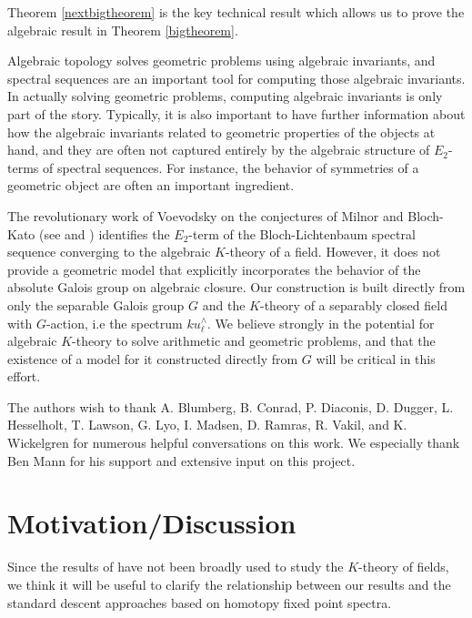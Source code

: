 \documentclass[11pt]{article}
\begin{document}
Theorem \ref{nextbigtheorem} is the key technical result which allows us to prove the algebraic result in Theorem \ref{bigtheorem}.  



{Algebraic topology solves geometric problems  using algebraic invariants, and spectral sequences are an important tool for computing those algebraic invariants.  In actually solving geometric problems, computing algebraic invariants is only part of the story.  Typically, it is also important to have further information about how the algebraic invariants related to geometric properties of the  objects at hand, and they are often not captured entirely by the algebraic structure of $E_2$-terms of  spectral sequences.  For instance, the behavior of symmetries of a geometric object are often an important ingredient.  }

{The revolutionary work of Voevodsky on the conjectures of Milnor and Bloch-Kato (see \cite{voevodsky} and \cite{weibel}) identifies the $E_2$-term of  the Bloch-Lichtenbaum spectral sequence converging to the algebraic $K$-theory of a field.  However,   it does not provide a geometric model that explicitly incorporates the behavior of the absolute Galois group on algebraic closure.    Our construction is built directly from only the separable  Galois group $G$ and the $K$-theory of a separably closed field with $G$-action, i.e the spectrum $ku^{\wedge}_{\ell}$. We believe strongly in the potential for algebraic $K$-theory to solve arithmetic and geometric problems, and that the existence of a model for it constructed directly from $G$ will be critical  in this effort.    }



The authors wish to thank A. Blumberg,  B. Conrad, P. Diaconis, D. Dugger, L. Hesselholt, T. Lawson, G. Lyo,  I. Madsen, D. Ramras, R. Vakil, and K. Wickelgren for numerous helpful conversations on this work.  We especially thank Ben Mann for his support and extensive input on this project. 










\section{Motivation/Discussion} Since the results of \cite{completion} have not been broadly used to study the $K$-theory of fields, we think it will be useful to clarify the relationship between our results and the standard descent approaches based on homotopy fixed point spectra.  
\end{document}
